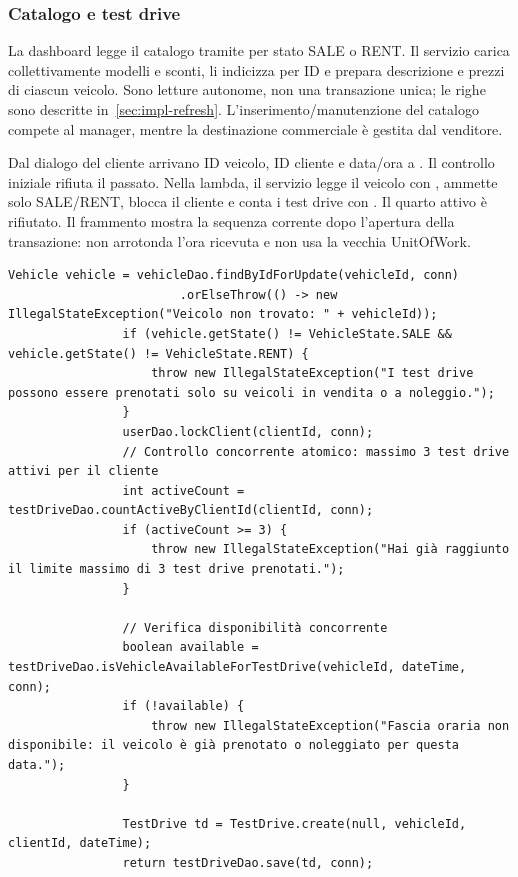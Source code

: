 \subsubsection{Catalogo e test drive}
La dashboard legge il catalogo tramite 
per stato SALE o RENT. Il servizio carica collettivamente modelli e sconti,
li indicizza per ID e prepara descrizione e prezzi di ciascun veicolo.
Sono letture autonome, non una transazione unica; le righe sono descritte
in~\ref{sec:impl-refresh}. L'inserimento/manutenzione del catalogo compete
al manager, mentre la destinazione commerciale è gestita dal venditore.

Dal dialogo del cliente arrivano ID veicolo, ID cliente e data/ora a
. Il controllo iniziale rifiuta il
passato. Nella lambda, il servizio legge il veicolo con ,
ammette solo SALE/RENT, blocca il cliente e conta i test drive con
. Il quarto attivo è rifiutato.
Il frammento mostra la sequenza corrente dopo l'apertura della transazione:
non arrotonda l'ora ricevuta e non usa la vecchia UnitOfWork.

\noindent\begin{minipage}{\linewidth}
\begin{lstlisting}[firstnumber=47,gobble=16,caption={Lock, controlli e inserimento nella lambda di bookTestDrive; omessi apertura e catch.},label=lst:test-drive]
                Vehicle vehicle = vehicleDao.findByIdForUpdate(vehicleId, conn)
                        .orElseThrow(() -> new IllegalStateException("Veicolo non trovato: " + vehicleId));
                if (vehicle.getState() != VehicleState.SALE && vehicle.getState() != VehicleState.RENT) {
                    throw new IllegalStateException("I test drive possono essere prenotati solo su veicoli in vendita o a noleggio.");
                }
                userDao.lockClient(clientId, conn);
                // Controllo concorrente atomico: massimo 3 test drive attivi per il cliente
                int activeCount = testDriveDao.countActiveByClientId(clientId, conn);
                if (activeCount >= 3) {
                    throw new IllegalStateException("Hai già raggiunto il limite massimo di 3 test drive prenotati.");
                }

                // Verifica disponibilità concorrente
                boolean available = testDriveDao.isVehicleAvailableForTestDrive(vehicleId, dateTime, conn);
                if (!available) {
                    throw new IllegalStateException("Fascia oraria non disponibile: il veicolo è già prenotato o noleggiato per questa data.");
                }

                TestDrive td = TestDrive.create(null, vehicleId, clientId, dateTime);
                return testDriveDao.save(td, conn);
\end{lstlisting}
\end{minipage}

